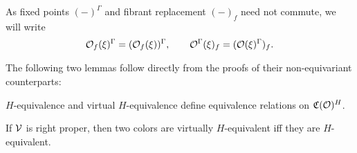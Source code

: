 \documentclass[a4paper,10pt
,draft
]{article}%
\newcommand{\I}{\mathbb I}
\newcommand{\J}{\mathbb J}
\renewcommand{\1}{\ensuremath{\mathbb{id}}}
\begin{document}
\begin{notation}
      As fixed points $(-)^\Gamma$ and fibrant replacement $(-)_f$ need not commute, we will write
      \begin{equation}
            \mathcal{O}_f(\xi)^\Gamma = (\mathcal{O}_f(\xi))^\Gamma,
            \qquad
            \mathcal{O}^\Gamma(\xi)_f = (\mathcal{O}(\xi)^{\Gamma})_f.
      \end{equation}
\end{notation}



The following two lemmas follow directly from the proofs of their non-equivariant counterparts:
\begin{lemma}
      \label{CAV_4.10_LEM}
      $H$-equivalence and virtual $H$-equivalence define equivalence relations on $\mathfrak C(\mathcal{O})^H$.
\end{lemma}

        
        
        


\begin{lemma}
      \label{RIGHTPROPER_LEM}
      If $\mathcal V$ is right proper, then two colors are virtually $H$-equivalent iff they are $H$-equivalent. 
\end{lemma}
\end{document}
